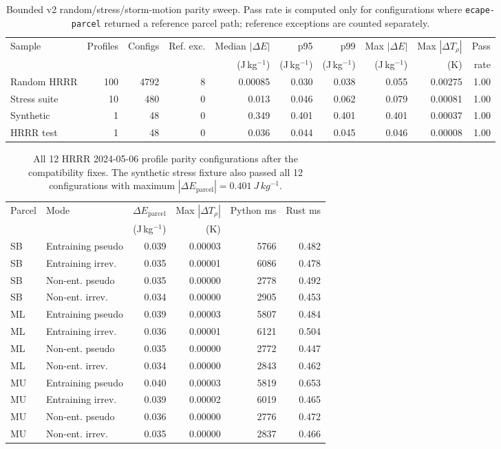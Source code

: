 \documentclass[11pt]{article}
\begin{document}
\begin{table}[H]
\centering
\scriptsize
\setlength{\tabcolsep}{2.2pt}
\caption{Bounded v2 random/stress/storm-motion parity sweep. Pass rate is computed only for configurations where \texttt{ecape-parcel} returned a reference parcel path; reference exceptions are counted separately.}
\label{tab:v2sweep}
\begin{tabular}{lrrrrrrrrr}
\toprule
Sample & Profiles & Configs & Ref. exc. & Median $|\Delta E|$ & p95 & p99 & Max $|\Delta E|$ & Max $|\Delta T_\rho|$ & Pass \\
 & & & & (J\,kg$^{-1}$) & (J\,kg$^{-1}$) & (J\,kg$^{-1}$) & (J\,kg$^{-1}$) & (K) & rate \\
\midrule
Random HRRR & 100 & 4792 & 8 & 0.00085 & 0.030 & 0.038 & 0.055 & 0.00275 & 1.00 \\
Stress suite & 10 & 480 & 0 & 0.013 & 0.046 & 0.062 & 0.079 & 0.00081 & 1.00 \\
Synthetic & 1 & 48 & 0 & 0.349 & 0.401 & 0.401 & 0.401 & 0.00037 & 1.00 \\
HRRR test & 1 & 48 & 0 & 0.036 & 0.044 & 0.045 & 0.046 & 0.00008 & 1.00 \\
\bottomrule
\end{tabular}
\end{table}

\begin{table}[H]
\centering
\small
\caption{All 12 HRRR 2024-05-06 profile parity configurations after the compatibility fixes. The synthetic stress fixture also passed all 12 configurations with maximum $|\Delta E_{\mathrm{parcel}}|=\SI{0.401}{J\,kg^{-1}}$.}
\label{tab:twelvemodes}
\begin{tabular}{llrrrr}
\toprule
Parcel & Mode & $\Delta E_{\mathrm{parcel}}$ & Max $|\Delta T_\rho|$ & Python ms & Rust ms \\
 & & (J\,kg$^{-1}$) & (K) & & \\
\midrule
SB & Entraining pseudo & 0.039 & 0.00003 & 5766 & 0.482 \\
SB & Entraining irrev. & 0.035 & 0.00001 & 6086 & 0.478 \\
SB & Non-ent. pseudo & 0.035 & 0.00000 & 2778 & 0.492 \\
SB & Non-ent. irrev. & 0.034 & 0.00000 & 2905 & 0.453 \\
ML & Entraining pseudo & 0.039 & 0.00003 & 5807 & 0.484 \\
ML & Entraining irrev. & 0.036 & 0.00001 & 6121 & 0.504 \\
ML & Non-ent. pseudo & 0.035 & 0.00000 & 2772 & 0.447 \\
ML & Non-ent. irrev. & 0.034 & 0.00000 & 2843 & 0.462 \\
MU & Entraining pseudo & 0.040 & 0.00003 & 5819 & 0.653 \\
MU & Entraining irrev. & 0.039 & 0.00002 & 6019 & 0.465 \\
MU & Non-ent. pseudo & 0.036 & 0.00000 & 2776 & 0.472 \\
MU & Non-ent. irrev. & 0.035 & 0.00000 & 2837 & 0.466 \\
\bottomrule
\end{tabular}
\end{table}
\end{document}
